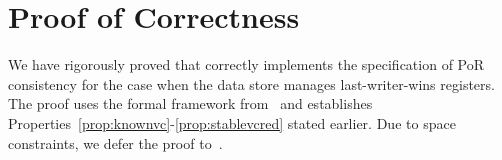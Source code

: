 \section{Proof of Correctness}
\label{sec:correctness}

We have rigorously proved that \System correctly implements the specification of
PoR consistency for the case when the data store manages last-writer-wins registers. The
proof uses the formal framework
from~\cite{sebastian-book,distrmm-popl,framework-concur15} and establishes
Properties~\ref{prop:knownvc}-\ref{prop:stablevcred} stated earlier. Due to
space constraints, we defer the proof
to~\tr{\ref{section:correctness-proof}}{\nappproof}.

